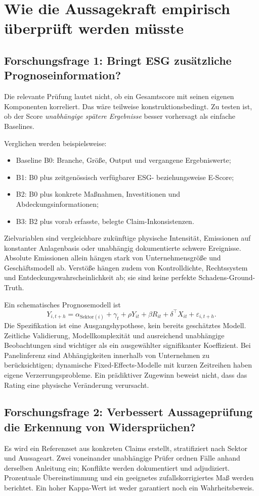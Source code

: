 \documentclass[11pt,a4paper]{article}
\begin{document}
\section{Wie die Aussagekraft empirisch überprüft werden müsste}
\label{sec:validation}
\subsection{Forschungsfrage 1: Bringt ESG zusätzliche Prognoseinformation?}
Die relevante Prüfung lautet nicht, ob ein Gesamtscore mit seinen eigenen Komponenten korreliert. Das wäre teilweise konstruktionsbedingt. Zu testen ist, ob der Score \emph{unabhängige spätere Ergebnisse} besser vorhersagt als einfache Baselines.

Verglichen werden beispielsweise:
\begin{itemize}
\item Baseline B0: Branche, Größe, Output und vergangene Ergebniswerte;
\item B1: B0 plus zeitgenössisch verfügbarer ESG- beziehungsweise E-Score;
\item B2: B0 plus konkrete Maßnahmen, Investitionen und Abdeckungsinformationen;
\item B3: B2 plus vorab erfasste, belegte Claim-Inkonsistenzen.
\end{itemize}
Zielvariablen sind vergleichbare zukünftige physische Intensität, Emissionen auf konstanter Anlagenbasis oder unabhängig dokumentierte schwere Ereignisse. Absolute Emissionen allein hängen stark von Unternehmensgröße und Geschäftsmodell ab. Verstöße hängen zudem von Kontrolldichte, Rechtssystem und Entdeckungswahrscheinlichkeit ab; sie sind keine perfekte Schadens-Ground-Truth.

Ein schematisches Prognosemodell ist
\begin{equation}
Y_{i,t+h}=\alpha_{\mathrm{Sektor}(i)}+\gamma_t+\rho Y_{it}+\beta R_{it}+\delta^\top X_{it}+\varepsilon_{i,t+h}.
\end{equation}
Die Spezifikation ist eine Ausgangshypothese, kein bereits geschätztes Modell. Zeitliche Validierung, Modellkomplexität und ausreichend unabhängige Beobachtungen sind wichtiger als ein ausgewählter signifikanter Koeffizient. Bei Panelinferenz sind Abhängigkeiten innerhalb von Unternehmen zu berücksichtigen; dynamische Fixed-Effects-Modelle mit kurzen Zeitreihen haben eigene Verzerrungsprobleme. Ein prädiktiver Zugewinn beweist nicht, dass das Rating eine physische Veränderung verursacht.

\subsection{Forschungsfrage 2: Verbessert Aussageprüfung die Erkennung von Widersprüchen?}
Es wird ein Referenzset aus konkreten Claims erstellt, stratifiziert nach Sektor und Aussageart. Zwei voneinander unabhängige Prüfer ordnen Fälle anhand derselben Anleitung ein; Konflikte werden dokumentiert und adjudiziert. Prozentuale Übereinstimmung und ein geeignetes zufallskorrigiertes Maß werden berichtet. Ein hoher Kappa-Wert ist weder garantiert noch ein Wahrheitsbeweis.
\end{document}
